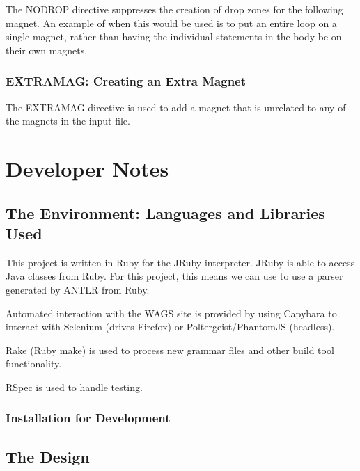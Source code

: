 \documentclass[letter,10pt]{article}
\begin{document}
The NODROP directive suppresses the creation of drop zones for the 
following magnet. An example of when this would be used is to put an 
entire loop on a single magnet, rather than having the individual 
statements in the body be on their own magnets.


\subsubsection{EXTRAMAG: Creating an Extra Magnet}

The EXTRAMAG directive is used to add a magnet that is unrelated to any 
of the magnets in the input file. 



\section{Developer Notes}

\subsection{The Environment: Languages and Libraries Used}


This project is written in Ruby for the JRuby interpreter. JRuby is able
to access Java classes from Ruby. For this project, this means we can 
use to use a parser generated by ANTLR from Ruby.

Automated interaction with the WAGS site is provided by using Capybara 
to interact with Selenium (drives Firefox) or Poltergeist/PhantomJS 
(headless).

Rake (Ruby make) is used to process new grammar files and other build 
tool functionality.

RSpec is used to handle testing.

\subsubsection{Installation for Development}

\subsection{The Design}
\end{document}
